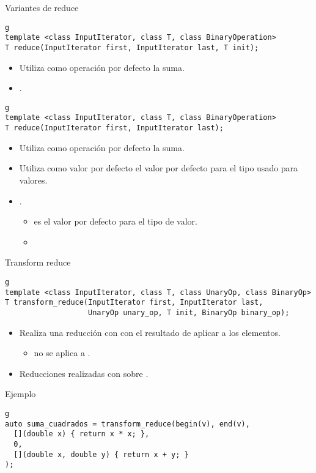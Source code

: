 \begin{frame}[t,fragile]{Variantes de reduce}
\begin{lstlisting}g
template <class InputIterator, class T, class BinaryOperation>
T reduce(InputIterator first, InputIterator last, T init);
\end{lstlisting}
\begin{itemize}
  \item Utiliza como operación por defecto la suma.
  \item {}.
\end{itemize}
\pause
\begin{lstlisting}g
template <class InputIterator, class T, class BinaryOperation>
T reduce(InputIterator first, InputIterator last);
\end{lstlisting}
\begin{itemize}
  \item Utiliza como operación por defecto la suma.
  \item Utiliza como valor por defecto el valor por defecto para el tipo usado para valores.
  \item {}.
    \begin{itemize}
      \item {} es el valor por defecto para el tipo de valor.
      \item {}
    \end{itemize}
\end{itemize}
\end{frame}

\begin{frame}[t,fragile]{Transform reduce}
\begin{lstlisting}g
template <class InputIterator, class T, class UnaryOp, class BinaryOp>
T transform_reduce(InputIterator first, InputIterator last, 
                   UnaryOp unary_op, T init, BinaryOp binary_op);
\end{lstlisting}
\begin{itemize}
  \item Realiza una reducción con  con el resultado de aplicar  a los elementos.
    \begin{itemize}
      \item {} no se aplica a .
    \end{itemize}
  \item Reducciones realizadas con  sobre .
\end{itemize}
\begin{block}{Ejemplo}
\begin{lstlisting}g
auto suma_cuadrados = transform_reduce(begin(v), end(v), 
  [](double x) { return x * x; },
  0,
  [](double x, double y) { return x + y; }
);
\end{lstlisting}
\end{block}
\end{frame}

